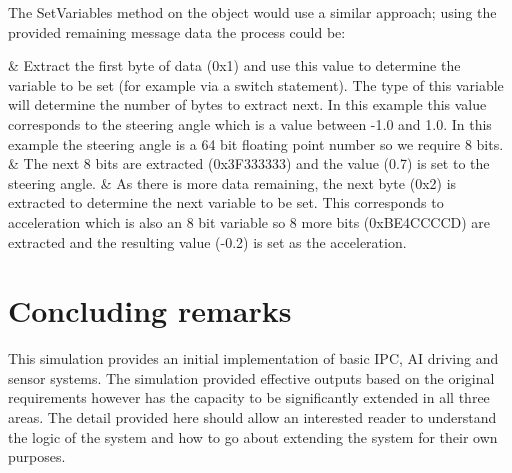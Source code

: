 \documentclass{article}
\begin{document}
The SetVariables method on the object would use a similar approach; using the provided remaining message data the process could be:
\begin{easylist}[itemize]
	& Extract the first byte of data (0x1) and use this value to determine the variable to be set (for example via a switch statement). The type of this variable will determine the number of bytes to extract next. In this example this value corresponds to the steering angle which is a value between -1.0 and 1.0. In this example the steering angle is a 64 bit floating point number so we require 8 bits.
	& The next 8 bits are extracted (0x3F333333) and the value (0.7) is set to the steering angle.
	& As there is more data remaining, the next byte (0x2) is extracted to determine the next variable to be set. This corresponds to acceleration which is also an 8 bit variable so 8 more bits (0xBE4CCCCD) are extracted and the resulting value (-0.2) is set as the acceleration.
\end{easylist}



\section{Concluding remarks}

This simulation provides an initial implementation of basic IPC, AI driving and sensor systems. The simulation provided effective outputs based on the original requirements however has the capacity to be significantly extended in all three areas. The detail provided here should allow an interested reader to understand the logic of the system and how to go about extending the system for their own purposes.
\end{document}
